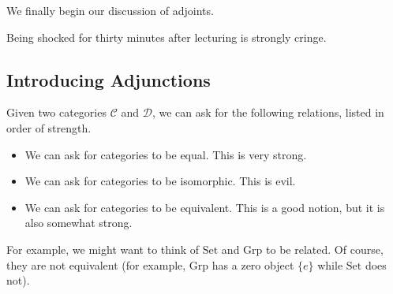\documentclass[../notes.tex]{subfiles}
\begin{document}

We finally begin our discussion of adjoints.
\begin{remark}
	Being shocked for thirty minutes after lecturing is strongly cringe.
\end{remark}

\subsection{Introducing Adjunctions}
Given two categories $\mathcal C$ and $\mathcal D$, we can ask for the following relations, listed in order of strength.
\begin{itemize}
	\item We can ask for categories to be equal. This is very strong.
	\item We can ask for categories to be isomorphic. This is evil.
	\item We can ask for categories to be equivalent. This is a good notion, but it is also somewhat strong.
\end{itemize}
For example, we might want to think of $\mathrm{Set}$ and $\mathrm{Grp}$ to be related. Of course, they are not equivalent (for example, $\mathrm{Grp}$ has a zero object $\{e\}$ while $\mathrm{Set}$ does not).
\end{document}
